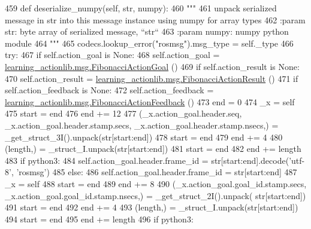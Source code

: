 \begin{DoxyCode}
459   \textcolor{keyword}{def }deserialize\_numpy(self, str, numpy):
460     \textcolor{stringliteral}{"""}
461 \textcolor{stringliteral}{    unpack serialized message in str into this message instance using numpy for array types}
462 \textcolor{stringliteral}{    :param str: byte array of serialized message, ``str``}
463 \textcolor{stringliteral}{    :param numpy: numpy python module}
464 \textcolor{stringliteral}{    """}
465     codecs.lookup\_error(\textcolor{stringliteral}{"rosmsg"}).msg\_type = self.\_type
466     \textcolor{keywordflow}{try}:
467       \textcolor{keywordflow}{if} self.action\_goal \textcolor{keywordflow}{is} \textcolor{keywordtype}{None}:
468         self.action\_goal = \hyperlink{classlearning__actionlib_1_1msg_1_1__FibonacciActionGoal_1_1FibonacciActionGoal}{learning\_actionlib.msg.FibonacciActionGoal}
      ()
469       \textcolor{keywordflow}{if} self.action\_result \textcolor{keywordflow}{is} \textcolor{keywordtype}{None}:
470         self.action\_result = \hyperlink{classlearning__actionlib_1_1msg_1_1__FibonacciActionResult_1_1FibonacciActionResult}{learning\_actionlib.msg.FibonacciActionResult}
      ()
471       \textcolor{keywordflow}{if} self.action\_feedback \textcolor{keywordflow}{is} \textcolor{keywordtype}{None}:
472         self.action\_feedback = \hyperlink{classlearning__actionlib_1_1msg_1_1__FibonacciActionFeedback_1_1FibonacciActionFeedback}{learning\_actionlib.msg.FibonacciActionFeedback}
      ()
473       end = 0
474       \_x = self
475       start = end
476       end += 12
477       (\_x.action\_goal.header.seq, \_x.action\_goal.header.stamp.secs, \_x.action\_goal.header.stamp.nsecs,) = 
      \_get\_struct\_3I().unpack(str[start:end])
478       start = end
479       end += 4
480       (length,) = \_struct\_I.unpack(str[start:end])
481       start = end
482       end += length
483       \textcolor{keywordflow}{if} python3:
484         self.action\_goal.header.frame\_id = str[start:end].decode(\textcolor{stringliteral}{'utf-8'}, \textcolor{stringliteral}{'rosmsg'})
485       \textcolor{keywordflow}{else}:
486         self.action\_goal.header.frame\_id = str[start:end]
487       \_x = self
488       start = end
489       end += 8
490       (\_x.action\_goal.goal\_id.stamp.secs, \_x.action\_goal.goal\_id.stamp.nsecs,) = \_get\_struct\_2I().unpack(
      str[start:end])
491       start = end
492       end += 4
493       (length,) = \_struct\_I.unpack(str[start:end])
494       start = end
495       end += length
496       \textcolor{keywordflow}{if} python3:

\end{DoxyCode}
